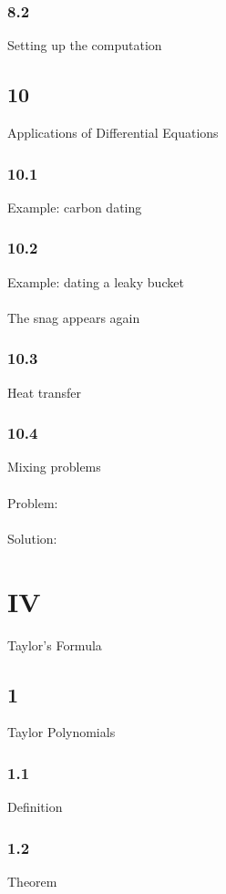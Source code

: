 \subsection{8.2}{Setting up the computation}

\section{10}{Applications of Differential Equations}
\subsection{10.1}{Example: carbon dating}
\subsection{10.2}{Example: dating a leaky bucket}
\subsubsection{}{The snag appears again}
\subsection{10.3}{Heat transfer}
\subsection{10.4}{Mixing problems}
\subsubsection{}{Problem:}
\subsubsection{}{Solution:}

\chapter{IV}{Taylor's Formula}
\section{1}{Taylor Polynomials}
\subsection{1.1}{Definition}
\subsection{1.2}{Theorem}
